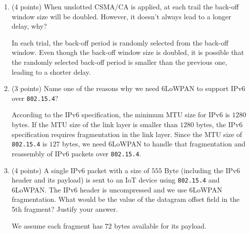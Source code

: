 \documentclass[12pt]{article}
\begin{document}
\begin{ejercicio}[20 points]
\begin{enumerate}[label=\alph*)]
\begin{enumerate}[label=\roman*)]
                In this case, the main aspect is the energy consumption, since some coordinators are powered by solar battery. Therefore, a network with Beacons would be the best option, where the PAN Coordinator could increase the Inactive Period of the frames, so that the coordinators can sleep for longer periods of time and save energy.
            \end{enumerate}
            \item (4 points) When unslotted CSMA/CA is applied, at each trail the back-off window size will be doubled. However, it doesn't always lead to a longer delay, why?
            
            In each trial, the back-off period is randomly selected from the back-off window. Even though the back-off window size is doubled, it is possible that the randomly selected back-off period is smaller than the previous one, leading to a shorter delay.
            \item (3 points) Name one of the reasons why we need 6LoWPAN to support IPv6 over \verb|802.15.4|?
            
            According to the IPv6 specification, the minimum MTU size for IPv6 is $1280$ bytes. If the MTU size of the link layer is smaller than $1280$ bytes, the IPv6 specification requires fragmentation in the link layer. Since the MTU size of \verb|802.15.4| is $127$ bytes, we need 6LoWPAN to handle that fragmentation and reassembly of IPv6 packets over \verb|802.15.4|.
            \item (4 points) A single IPv6 packet with a size of $555$ Byte (including the IPv6 header and its payload) is sent to an IoT device using \verb|802.15.4| and 6LoWPAN. The IPv6 header is uncompressed and we use 6LoWPAN fragmentation. What would be the value of the datagram offset field in the 5th fragment? Justify your answer.
            
            \begin{observacion}
            We assume each fragment has $72$ bytes available for its payload.
            \end{observacion}


\end{enumerate}
\end{ejercicio}
\end{document}
